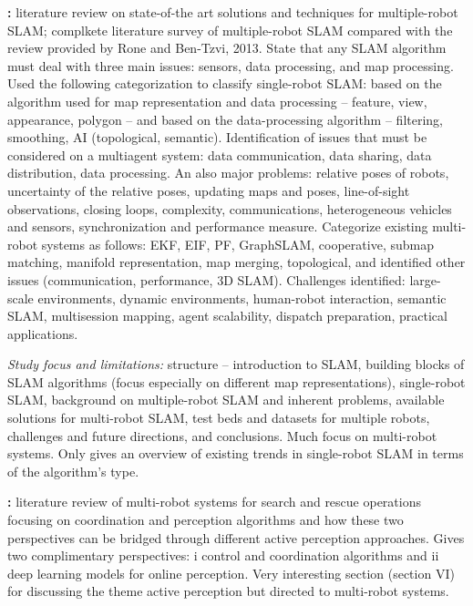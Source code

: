 \documentclass[10pt,a4paper,notitlepage,twocolumn,oneside]{article}
\begin{document}
\textbf{\cite{review:saeedi:2016}:} literature review on state-of-the art solutions and techniques for multiple-robot SLAM; complkete literature survey of multiple-robot SLAM compared with the review provided by Rone and Ben-Tzvi, 2013. State that any SLAM algorithm must deal with three main issues: sensors, data processing, and map processing. Used the following categorization to classify single-robot SLAM: based on the algorithm used for map representation and data processing -- feature, view, appearance, polygon -- and based on the data-processing algorithm -- filtering, smoothing, AI (topological, semantic). Identification of issues that must be considered on a multiagent system: data communication, data sharing, data distribution, data processing. An also major problems: relative poses of robots, uncertainty of the relative poses, updating maps and poses, line-of-sight observations, closing loops, complexity, communications, heterogeneous vehicles and sensors, synchronization and performance measure. Categorize existing multi-robot systems as follows: EKF, EIF, PF, GraphSLAM, cooperative, submap matching, manifold representation, map merging, topological, and identified other issues (communication, performance, 3D SLAM). Challenges identified: large-scale environments, dynamic environments, human-robot interaction, semantic SLAM, multisession mapping, agent scalability, dispatch preparation, practical applications.

\textit{Study focus and limitations:} structure -- introduction to SLAM, building blocks of SLAM algorithms (focus especially on different map representations), single-robot SLAM, background on multiple-robot SLAM and inherent problems, available solutions for multi-robot SLAM, test beds and datasets for multiple robots, challenges and future directions, and conclusions. Much focus on multi-robot systems. Only gives an overview of existing trends in single-robot SLAM in terms of the algorithm's type.

\textbf{\cite{review:queralta:2020}:} literature review of multi-robot systems for search and rescue operations focusing on coordination and perception algorithms and how these two perspectives can be bridged through different active perception approaches. Gives two complimentary perspectives: i control and coordination algorithms and ii deep learning models for online perception. Very interesting section (section VI) for discussing the theme active perception but directed to multi-robot systems.
\end{document}
